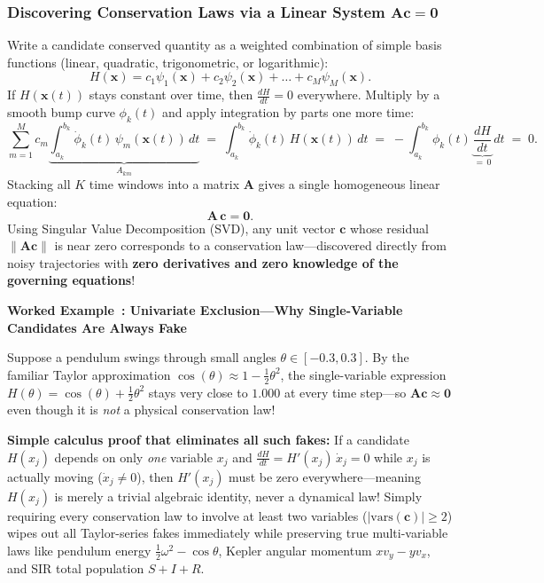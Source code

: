 \documentclass[11pt,a4paper]{article}
\newcounter{workedexcnt}
\newenvironment{workedexample}[1]{%
  \refstepcounter{workedexcnt}%
  \begin{lrbox}{\calloutbox}%
    \begin{minipage}{\dimexpr\textwidth-2\fboxsep-2\fboxrule\relax}
      \vspace{0.3em}
      \noindent\textbf{\color{black!85}Worked Example~\theworkedexcnt: #1}\par\smallskip
      \normalfont
}{%
      \vspace{0.3em}
    \end{minipage}%
  \end{lrbox}%
  \par\medskip\noindent
  \fcolorbox{gray!45}{gray!8}{\usebox{\calloutbox}}%
  \par\medskip
}
\begin{document}
\subsubsection{Discovering Conservation Laws via a Linear System \texorpdfstring{$\mathbf{A}\mathbf{c} = \mathbf{0}$}{Ac = 0}}
Write a candidate conserved quantity as a weighted combination of simple basis functions (linear, quadratic, trigonometric, or logarithmic):
\begin{equation}
  H(\mathbf{x}) = c_1 \psi_1(\mathbf{x}) + c_2 \psi_2(\mathbf{x}) + \dots + c_M \psi_M(\mathbf{x}).
\end{equation}
If $H(\mathbf{x}(t))$ stays constant over time, then $\frac{dH}{dt} = 0$ everywhere. Multiply by a smooth bump curve $\phi_k(t)$ and apply integration by parts one more time:
\begin{equation}
  \sum_{m=1}^M c_m \underbrace{\int_{a_k}^{b_k} \dot{\phi}_k(t)\,\psi_m(\mathbf{x}(t))\,dt}_{A_{km}}
  \;=\; \int_{a_k}^{b_k} \dot{\phi}_k(t)\,H(\mathbf{x}(t))\,dt
  \;=\; -\int_{a_k}^{b_k} \phi_k(t)\,\underbrace{\frac{dH}{dt}}_{=\,0}\,dt \;=\; 0.
\end{equation}
Stacking all $K$ time windows into a matrix $\mathbf{A}$ gives a single homogeneous linear equation:
\begin{equation}
  \mathbf{A}\,\mathbf{c} = \mathbf{0}.
\end{equation}
Using Singular Value Decomposition (SVD), any unit vector $\mathbf{c}$ whose residual $\|\mathbf{A}\mathbf{c}\|$ is near zero corresponds to a conservation law—discovered directly from noisy trajectories with \textbf{zero derivatives and zero knowledge of the governing equations}!

\begin{workedexample}{Univariate Exclusion—Why Single-Variable Candidates Are Always Fake}
Suppose a pendulum swings through small angles $\theta \in [-0.3, 0.3]$. By the familiar Taylor approximation $\cos(\theta) \approx 1 - \frac{1}{2}\theta^2$, the single-variable expression $H(\theta) = \cos(\theta) + \frac{1}{2}\theta^2$ stays very close to $1.000$ at every time step—so $\mathbf{A}\mathbf{c} \approx \mathbf{0}$ even though it is \emph{not} a physical conservation law!

\textbf{Simple calculus proof that eliminates all such fakes:} If a candidate $H(x_j)$ depends on only \emph{one} variable $x_j$ and $\frac{dH}{dt} = H'(x_j)\,\dot{x}_j = 0$ while $x_j$ is actually moving ($\dot{x}_j \neq 0$), then $H'(x_j)$ must be zero everywhere—meaning $H(x_j)$ is merely a trivial algebraic identity, never a dynamical law! Simply requiring every conservation law to involve at least two variables ($|\text{vars}(\mathbf{c})| \ge 2$) wipes out all Taylor-series fakes immediately while preserving true multi-variable laws like pendulum energy $\frac{1}{2}\omega^2 - \cos\theta$, Kepler angular momentum $x v_y - y v_x$, and SIR total population $S+I+R$.
\end{workedexample}
\end{document}
